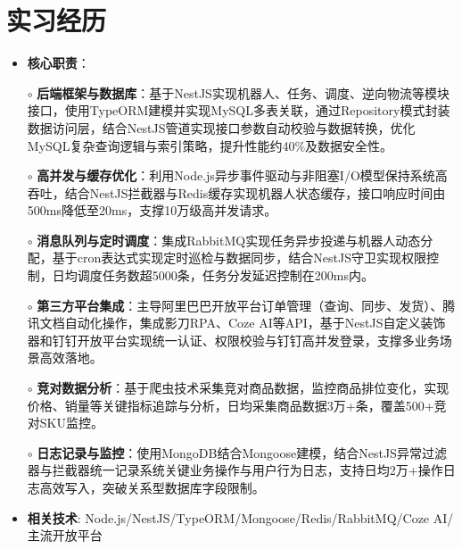 \section{实习经历}
  \begin{normalsize}
    \begin{itemize}
    \item \textbf{核心职责}：
    \setlength{\itemindent}{1em} %
      \item[$\circ$] \textbf{后端框架与数据库}：基于NestJS实现机器人、任务、调度、逆向物流等模块接口，使用TypeORM建模并实现MySQL多表关联，通过Repository模式封装数据访问层，结合NestJS管道实现接口参数自动校验与数据转换，优化MySQL复杂查询逻辑与索引策略，提升性能约40\%及数据安全性。
      \item[$\circ$] \textbf{高并发与缓存优化}：利用Node.js异步事件驱动与非阻塞I/O模型保持系统高吞吐，结合NestJS拦截器与Redis缓存实现机器人状态缓存，接口响应时间由500ms降低至20ms，支撑10万级高并发请求。
      \item[$\circ$] \textbf{消息队列与定时调度}：集成RabbitMQ实现任务异步投递与机器人动态分配，基于cron表达式实现定时巡检与数据同步，结合NestJS守卫实现权限控制，日均调度任务数超5000条，任务分发延迟控制在200ms内。
      \item[$\circ$] \textbf{第三方平台集成}：主导阿里巴巴开放平台订单管理（查询、同步、发货）、腾讯文档自动化操作，集成影刀RPA、Coze AI等API，基于NestJS自定义装饰器和钉钉开放平台实现统一认证、权限校验与钉钉高并发登录，支撑多业务场景高效落地。
      \item[$\circ$] \textbf{竞对数据分析}：基于爬虫技术采集竞对商品数据，监控商品排位变化，实现价格、销量等关键指标追踪与分析，日均采集商品数据3万+条，覆盖500+竞对SKU监控。
      \item[$\circ$] \textbf{日志记录与监控}：使用MongoDB结合Mongoose建模，结合NestJS异常过滤器与拦截器统一记录系统关键业务操作与用户行为日志，支持日均2万+操作日志高效写入，突破关系型数据库字段限制。
    \setlength{\itemindent}{0em} %
    \item \textbf{相关技术}: Node.js/NestJS/TypeORM/Mongoose/Redis/RabbitMQ/Coze AI/主流开放平台
    \end{itemize}
  \end{normalsize}
